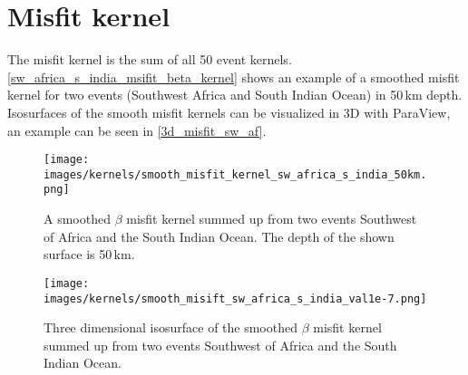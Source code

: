 \section{Misfit kernel}

The misfit kernel is the sum of all 50 event kernels. \autoref{sw_africa_s_india_msifit_beta_kernel} shows an example of a 
smoothed misfit kernel for two events (Southwest Africa and South Indian Ocean) in 50$\,$km depth.
Isosurfaces of the smooth misfit kernels can be visualized in 3D with ParaView, an example can be seen in \autoref{3d_misfit_sw_af}.

\begin{figure}[h]
\begin{center}
\texttt{[image: images/kernels/smooth\_misfit\_kernel\_sw\_africa\_s\_india\_50km.png]}
\caption[Surface of a smooth misfit kernel for two events]{A smoothed $\beta$ misfit kernel summed up from two events Southwest of Africa and the South Indian Ocean.
The depth of the shown surface is 50$\,$km.}  
\label{sw_africa_s_india_msifit_beta_kernel}
\end{center}
\end{figure}

\begin{figure}[h]
\begin{center}
\texttt{[image: images/kernels/smooth\_misift\_sw\_africa\_s\_india\_val1e-7.png]}
\caption[3D isosurface of a misfit kernel for two events.]{Three dimensional isosurface of the smoothed $\beta$ 
misfit kernel summed up from two events Southwest of Africa and the South Indian Ocean. 
}  
\label{3d_misfit_sw_af}
\end{center}
\end{figure}

